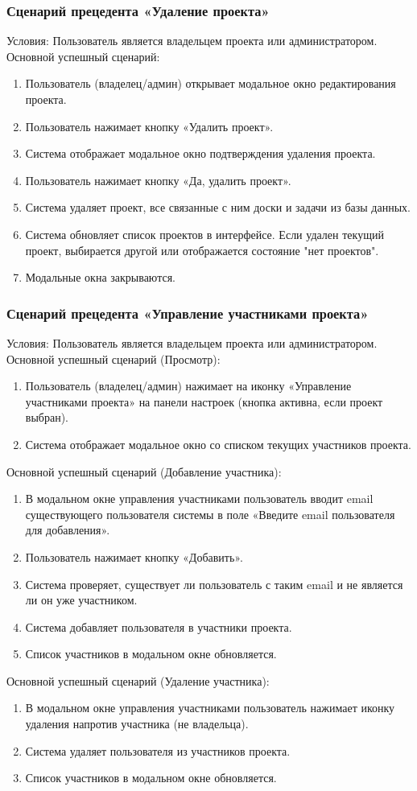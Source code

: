 \subsubsection{Сценарий прецедента «Удаление проекта»}
Условия: Пользователь является владельцем проекта или администратором.
Основной успешный сценарий:
\begin{enumerate}
	\item Пользователь (владелец/админ) открывает модальное окно редактирования проекта.
	\item Пользователь нажимает кнопку «Удалить проект».
	\item Система отображает модальное окно подтверждения удаления проекта.
	\item Пользователь нажимает кнопку «Да, удалить проект».
	\item Система удаляет проект, все связанные с ним доски и задачи из базы данных.
	\item Система обновляет список проектов в интерфейсе. Если удален текущий проект, выбирается другой или отображается состояние "нет проектов".
	\item Модальные окна закрываются.
\end{enumerate}

\subsubsection{Сценарий прецедента «Управление участниками проекта»}
Условия: Пользователь является владельцем проекта или администратором.
Основной успешный сценарий (Просмотр):
\begin{enumerate}
	\item Пользователь (владелец/админ) нажимает на иконку «Управление участниками проекта» на панели настроек (кнопка активна, если проект выбран).
	\item Система отображает модальное окно со списком текущих участников проекта.
\end{enumerate}
Основной успешный сценарий (Добавление участника):
\begin{enumerate}
	\item В модальном окне управления участниками пользователь вводит email существующего пользователя системы в поле «Введите email пользователя для добавления».
	\item Пользователь нажимает кнопку «Добавить».
	\item Система проверяет, существует ли пользователь с таким email и не является ли он уже участником.
	\item Система добавляет пользователя в участники проекта.
	\item Список участников в модальном окне обновляется.
\end{enumerate}
Основной успешный сценарий (Удаление участника):
\begin{enumerate}
	\item В модальном окне управления участниками пользователь нажимает иконку удаления напротив участника (не владельца).
	\item Система удаляет пользователя из участников проекта.
	\item Список участников в модальном окне обновляется.
\end{enumerate}

